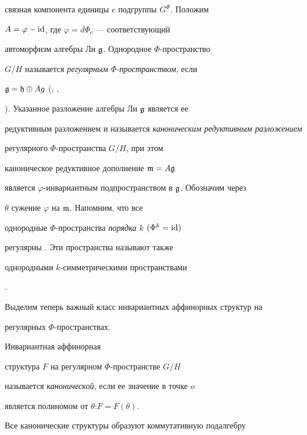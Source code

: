 связная компонента единицы $e$ подгруппы  $G^{\Phi}$. Положим


$A=\varphi-\operatorname{id}$, где $\varphi=d\Phi_e$ --- соответствующий


автоморфизм алгебры Ли $\frak{g}$. Однородное $\Phi$-пространство


$G/H$ называется {\it регулярным $\Phi$-пространством}, если


$\frak{g}=\frak{h}\oplus A\frak{}g$ (\cite{13}, \cite{25},


\cite{26}). Указанное разложение алгебры Ли $\frak{g}$ является ее


редуктивным разложением и называется {\it каноническим редуктивным разложением}


\cite{25} регулярного $\Phi$-пространства $G/H$, при этом


каноническое редуктивное дополнение $\frak{m}=A\frak{g}$


является $\varphi$-инвариантным подпространством в $\frak{g}$. Обозначим через


$\theta$ сужение $\varphi$ на $\frak{m}$. Напомним, что все


однородные $\Phi$-пространства {\it порядка $k$} $(\Phi^k=\operatorname{id})$


регулярны \cite{25}. Эти пространства называют также {\it


однородными $k$-симметрическими пространствами} \cite{27}.





Выделим теперь важный класс инвариантных аффинорных структур на


регулярных $\Phi$-пространствах.





\begin{defn}


Инвариантная аффинорная


структура $F$ на регулярном $\Phi$-простран\-стве $G/H$


называется {\it канонической}, если ее значение в точке $o$


является полиномом от $\theta$:\linebreak $F=F(\theta)$.


\end{defn}





Все канонические структуры образуют коммутативную подалгебру


